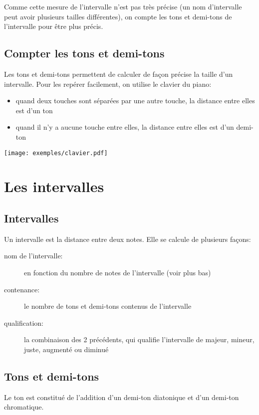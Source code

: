 Comme cette mesure de l'intervalle n'est pas très précise (un nom d'intervalle peut avoir plusieurs tailles différentes), on compte les tons et demi-tons de l'intervalle pour être plus précis.

\section{Compter les tons et demi-tons}
Les tons et demi-tons permettent de calculer de façon précise la taille d'un intervalle. Pour les repérer facilement, on utilise le clavier du piano:

\begin{itemize}
\item quand deux touches sont séparées par une autre touche, la distance entre elles est d'un ton
\item quand il n'y a aucune touche entre elles, la distance entre elles est d'un demi-ton
\end{itemize}
\begin{center}
\texttt{[image: exemples/clavier.pdf]}
\end{center}


\chapter{Les intervalles}
\section{Intervalles}
Un intervalle est la distance entre deux notes. Elle se calcule de plusieurs façons:
\begin{description}
\item[nom de l'intervalle:] en fonction du nombre de notes de l'intervalle (voir plus bas) 
\item[contenance:] le nombre de tons et demi-tons contenus de l'intervalle
\item[qualification:] la combinaison des 2 précédents, qui qualifie l'intervalle de majeur, mineur, juste, augmenté ou diminué
\end{description}

\section{Tons et demi-tons}
Le ton est constitué de l'addition d'un demi-ton diatonique et d'un demi-ton chromatique.
